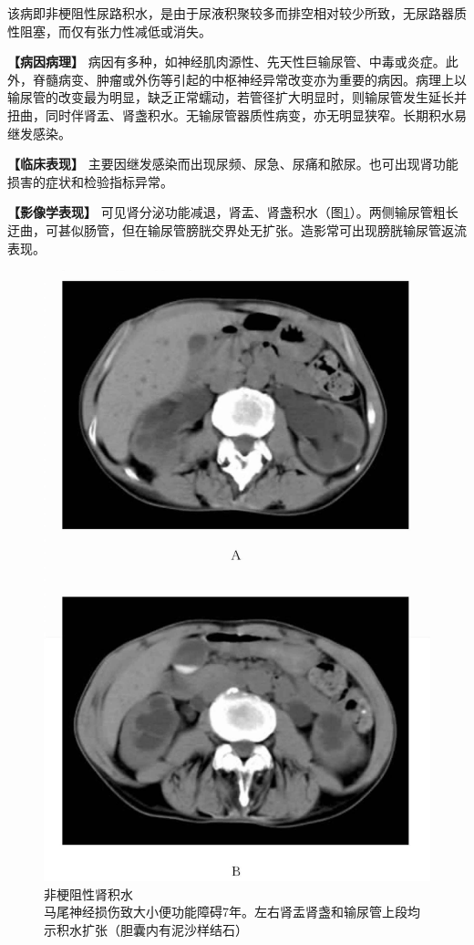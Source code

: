 该病即非梗阻性尿路积水，是由于尿液积聚较多而排空相对较少所致，无尿路器质性阻塞，而仅有张力性减低或消失。

\textbf{【病因病理】}
病因有多种，如神经肌肉源性、先天性巨输尿管、中毒或炎症。此外，脊髓病变、肿瘤或外伤等引起的中枢神经异常改变亦为重要的病因。病理上以输尿管的改变最为明显，缺乏正常蠕动，若管径扩大明显时，则输尿管发生延长并扭曲，同时伴肾盂、肾盏积水。无输尿管器质性病变，亦无明显狭窄。长期积水易继发感染。

\textbf{【临床表现】}
主要因继发感染而出现尿频、尿急、尿痛和脓尿。也可出现肾功能损害的症状和检验指标异常。

\textbf{【影像学表现】}
可见肾分泌功能减退，肾盂、肾盏积水（图\ref{fig15-11}）。两侧输尿管粗长迂曲，可甚似肠管，但在输尿管膀胱交界处无扩张。造影常可出现膀胱输尿管返流表现。

\begin{figure}[!htbp]
 \centering
 \includegraphics[width=.7\textwidth,height=\textheight,keepaspectratio]{./images/Image00326.jpg}
 \captionsetup{justification=centering}
 \caption{非梗阻性肾积水\\{\small 马尾神经损伤致大小便功能障碍7年。左右肾盂肾盏和输尿管上段均示积水扩张（胆囊内有泥沙样结石）}}
 \label{fig15-11}
  \end{figure} 


